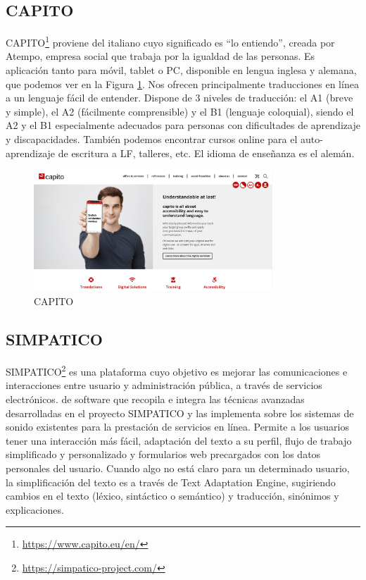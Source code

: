 \subsection{CAPITO }

CAPITO\footnote{\href{https://www.capito.eu/en/}{https://www.capito.eu/en/}} proviene del italiano cuyo significado es ``lo entiendo'', creada por Atempo, empresa social que trabaja por la igualdad de las personas. Es aplicación tanto para móvil, tablet o PC, disponible en lengua inglesa y alemana, que podemos ver en la Figura \ref{fig:capito}. Nos ofrecen principalmente traducciones en línea a un lenguaje fácil de entender. Dispone de 3 niveles de traducción: el A1 (breve y simple), el A2 (fácilmente comprensible) y el B1 (lenguaje coloquial), siendo el A2 y el B1 especialmente adecuados para personas con dificultades de aprendizaje y discapacidades. 
También podemos encontrar cursos online para el auto-aprendizaje de escritura a LF, talleres, etc. El idioma de enseñanza es el alemán.
\begin{figure}[h]
	\centering
	\includegraphics[width=0.8\textwidth]{Imagenes/ProyectosMateriales/capito}
	\caption{CAPITO}
	\label{fig:capito}
\end{figure} 


\subsection{SIMPATICO }

SIMPATICO\footnote{\href{https://simpatico-project.com/}{https://simpatico-project.com/}} es una plataforma cuyo objetivo es mejorar las comunicaciones e interacciones entre usuario y administración pública, a través de servicios electrónicos.
de software que recopila e integra las técnicas avanzadas desarrolladas en el proyecto SIMPATICO y las implementa sobre los sistemas de sonido 
existentes para la prestación de servicios en línea. Permite a los usuarios tener una interacción más fácil, adaptación del texto a su perfil, flujo de trabajo simplificado y personalizado y formularios web precargados con los datos personales del usuario.
Cuando algo no está claro para un determinado usuario, la simplificación del texto es a través de Text Adaptation Engine, sugiriendo cambios en el texto (léxico, sintáctico o semántico) y traducción, sinónimos y explicaciones. 

